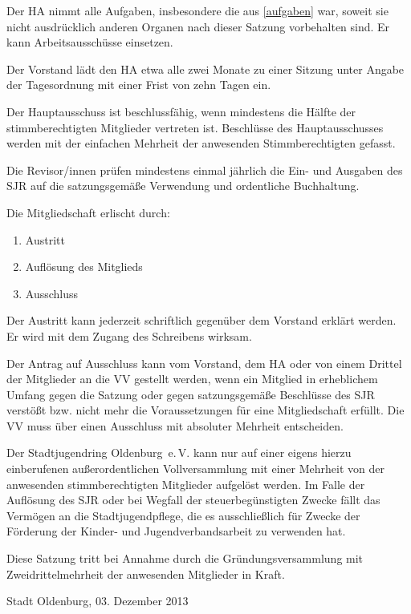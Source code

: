 \documentclass[10pt,a4paper,oneside,parskip=half]{scrartcl}
\begin{document}
\begin{contract}
Der HA nimmt alle Aufgaben, insbesondere die aus \ref{aufgaben} war, soweit sie nicht ausdrücklich anderen Organen nach dieser Satzung vorbehalten sind. Er kann Arbeitsausschüsse einsetzen.

Der Vorstand lädt den HA etwa alle zwei Monate zu einer Sitzung unter Angabe der Tagesordnung mit einer Frist von zehn Tagen ein.

Der Hauptausschuss ist beschlussfähig, wenn mindestens die Hälfte der stimmberechtigten Mitglieder vertreten ist. Beschlüsse des Hauptausschusses werden mit der einfachen Mehrheit der anwesenden Stimmberechtigten gefasst.

Die Revisor/innen prüfen mindestens einmal jährlich die Ein- und Ausgaben des SJR auf die satzungsgemäße Verwendung und ordentliche Buchhaltung.

\label{mitgliedschaftsende}
Die Mitgliedschaft erlischt durch:
\begin{enumerate}
\item Austritt
\item Auflösung des Mitglieds
\item Ausschluss
\end{enumerate}

Der Austritt kann jederzeit schriftlich gegenüber dem Vorstand erklärt werden. Er wird mit dem Zugang des Schreibens wirksam.

Der Antrag auf Ausschluss kann vom Vorstand, dem HA oder von einem Drittel der Mitglieder an die VV gestellt werden, wenn ein Mitglied in erheblichem Umfang gegen die Satzung oder gegen satzungsgemäße Beschlüsse des SJR verstößt bzw. nicht mehr die Voraussetzungen für eine Mitgliedschaft erfüllt. Die VV muss über einen Ausschluss mit absoluter Mehrheit entscheiden.

Der Stadtjugendring Oldenburg~e.\,V. kann nur auf einer eigens hierzu einberufenen außerordentlichen Vollversammlung mit einer Mehrheit von  der anwesenden stimmberechtigten Mitglieder aufgelöst werden.
Im Falle der Auflösung des SJR oder bei Wegfall der steuerbegünstigten Zwecke fällt das Vermögen an die Stadtjugendpflege, die es ausschließlich für Zwecke der Förderung der Kinder- und Jugendverbandsarbeit zu verwenden hat.

Diese Satzung tritt bei Annahme durch die Gründungsversammlung mit Zweidrittelmehrheit der anwesenden Mitglieder in Kraft.

\end{contract}
\vspace{1cm}
Stadt Oldenburg, 03. Dezember 2013
\end{document}
